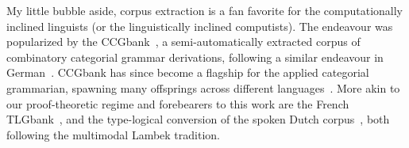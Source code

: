 My little bubble aside, corpus extraction is a fan favorite for the computationally inclined linguists (or the linguistically inclined computists).
The endeavour was popularized by the CCGbank~\cite{10.1162/coli.2007.33.3.355}, a semi-automatically extracted corpus of combinatory categorial grammar derivations, following a similar endeavour in German~\cite{hockenmaier2006creating}.
CCGbank has since become a flagship for the applied categorial grammarian, spawning many offsprings across different languages~\cite[inter alia]{johan2009converting,tse2010chinese,ambati2018hindi}.
More akin to our proof-theoretic regime and forebearers to this work are the French TLGbank~\cite{moot:inria-00494062}, and the type-logical conversion of the spoken Dutch corpus~\cite{moot2010extraction}, both following the multimodal Lambek tradition.




